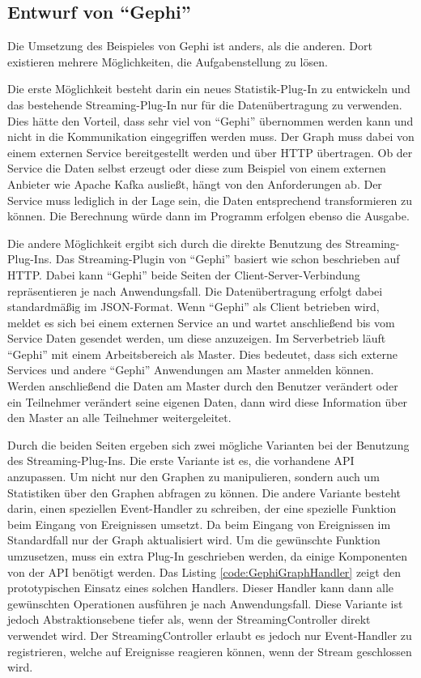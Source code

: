 \subsection{Entwurf von \enquote{Gephi}}
Die Umsetzung des Beispieles von Gephi ist anders, als die anderen. Dort
existieren mehrere Möglichkeiten, die Aufgabenstellung zu lösen.

Die erste Möglichkeit besteht darin ein neues Statistik-Plug-In zu entwickeln
und das bestehende Streaming-Plug-In nur für die Datenübertragung zu verwenden.
Dies hätte den Vorteil, dass sehr viel von \enquote{Gephi} übernommen werden
kann und nicht in die Kommunikation eingegriffen werden muss. Der Graph muss
dabei von einem externen Service bereitgestellt werden und über HTTP übertragen.
Ob der Service die Daten selbst erzeugt oder diese zum Beispiel von einem
externen Anbieter wie Apache Kafka ausließt, hängt von den Anforderungen ab. Der
Service muss lediglich in der Lage sein, die Daten entsprechend transformieren
zu können. Die Berechnung würde dann im Programm erfolgen ebenso die Ausgabe.

Die andere Möglichkeit ergibt sich durch die direkte Benutzung des
Streaming-Plug-Ins. Das Streaming-Plugin von \enquote{Gephi} basiert wie schon
beschrieben auf HTTP. Dabei kann \enquote{Gephi} beide Seiten der
Client-Server-Verbindung repräsentieren je nach Anwendungsfall. Die
Datenübertragung erfolgt dabei standardmäßig im JSON-Format. Wenn \enquote{Gephi}
als Client betrieben wird, meldet es sich bei einem externen Service an und wartet
anschließend bis vom Service Daten gesendet werden, um diese anzuzeigen. Im
Serverbetrieb läuft \enquote{Gephi} mit einem Arbeitsbereich als Master. Dies
bedeutet, dass sich externe Services und andere \enquote{Gephi} Anwendungen am
Master anmelden können. Werden anschließend die Daten am Master durch den
Benutzer verändert oder ein Teilnehmer verändert seine eigenen Daten, dann wird
diese Information über den Master an alle Teilnehmer weitergeleitet.

Durch die beiden Seiten ergeben sich zwei mögliche Varianten bei der Benutzung
des Streaming-Plug-Ins. Die erste Variante ist es, die vorhandene \gls{API}
anzupassen. Um nicht nur den Graphen zu manipulieren, sondern auch um Statistiken
über den Graphen abfragen zu können. Die andere Variante besteht darin, einen
speziellen Event-Handler zu schreiben, der eine spezielle Funktion beim Eingang
von Ereignissen umsetzt. Da beim Eingang von Ereignissen im Standardfall nur der
Graph aktualisiert wird. Um die gewünschte Funktion umzusetzen, muss ein extra
Plug-In geschrieben werden, da einige Komponenten von der \gls{API} benötigt
werden. Das Listing \ref{code:GephiGraphHandler} zeigt den prototypischen Einsatz
eines solchen Handlers. Dieser Handler kann dann alle gewünschten Operationen
ausführen je nach Anwendungsfall. Diese Variante ist jedoch Abstraktionsebene
tiefer als, wenn der StreamingController direkt verwendet wird. Der
StreamingController erlaubt es jedoch nur Event-Handler zu registrieren, welche
auf Ereignisse reagieren können, wenn der Stream geschlossen wird.

